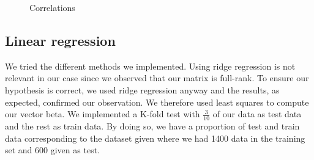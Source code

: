 \documentclass{article} %
\begin{document}
\begin{figure}[!h]
\center

\hfill
{}
\caption{Correlations}
\end{figure}



\subsection{Linear regression}
We tried the different methods we implemented. Using ridge regression is not relevant in our case since we observed that our matrix is full-rank. To ensure our hypothesis is correct, we used ridge regression anyway and the results, as expected, confirmed our observation. We therefore used least squares to compute our vector beta. We implemented a K-fold test with $\frac{3}{10}$ of our data as test data and the rest as train data. By doing so, we have a proportion of test and train data corresponding to the dataset given where we had 1400 data in the training set and 600 given as test. 
\end{document}
